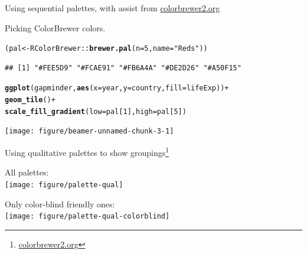 \documentclass[table]{beamer}\usepackage[]{graphicx}\usepackage[]{color}
\makeatletter
\newcommand{\hlnum}[1]{\textcolor[rgb]{0.686,0.059,0.569}{#1}}%
\newcommand{\hlstr}[1]{\textcolor[rgb]{0.192,0.494,0.8}{#1}}%
\newcommand{\hlopt}[1]{\textcolor[rgb]{0,0,0}{#1}}%
\newcommand{\hlstd}[1]{\textcolor[rgb]{0.345,0.345,0.345}{#1}}%
\newcommand{\hlkwb}[1]{\textcolor[rgb]{0.69,0.353,0.396}{#1}}%
\newcommand{\hlkwc}[1]{\textcolor[rgb]{0.333,0.667,0.333}{#1}}%
\newcommand{\hlkwd}[1]{\textcolor[rgb]{0.737,0.353,0.396}{\textbf{#1}}}%
\newenvironment{kframe}{%
 \def\at@end@of@kframe{}%
 \ifinner\ifhmode%
  \def\at@end@of@kframe{\end{minipage}}%
  \begin{minipage}{\columnwidth}%
 \fi\fi%
 \def\FrameCommand##1{\hskip\@totalleftmargin \hskip-\fboxsep
 \colorbox{shadecolor}{##1}\hskip-\fboxsep
     \hskip-\linewidth \hskip-\@totalleftmargin \hskip\columnwidth}%
 \MakeFramed {\advance\hsize-\width
   \@totalleftmargin\z@ \linewidth\hsize
   \@setminipage}}%
 {\par\unskip\endMakeFramed%
 \at@end@of@kframe}
\newenvironment{knitrout}{}{} %
\makeatother
\begin{document}

\begin{frame}[fragile]{Using sequential palettes, with assist from \href{https://colorbrewer2.org/}{colorbrewer2.org}}

Picking ColorBrewer colors.
\begin{knitrout}\tiny
{}\color{fgcolor}\begin{kframe}
\begin{alltt}
\hlstd{(pal} \hlkwb{<-} \hlstd{RColorBrewer}\hlopt{::}\hlkwd{brewer.pal}\hlstd{(}\hlkwc{n}\hlstd{=}\hlnum{5}\hlstd{,} \hlkwc{name}\hlstd{=}\hlstr{"Reds"}\hlstd{))}
\end{alltt}
\begin{verbatim}
## [1] "#FEE5D9" "#FCAE91" "#FB6A4A" "#DE2D26" "#A50F15"
\end{verbatim}
\begin{alltt}
\hlkwd{ggplot}\hlstd{(gapminder,} \hlkwd{aes}\hlstd{(}\hlkwc{x}\hlstd{=year,} \hlkwc{y}\hlstd{=country,} \hlkwc{fill}\hlstd{=lifeExp))} \hlopt{+}
    \hlkwd{geom_tile}\hlstd{()} \hlopt{+}
    \hlkwd{scale_fill_gradient}\hlstd{(}\hlkwc{low}\hlstd{=pal[}\hlnum{1}\hlstd{],} \hlkwc{high}\hlstd{=pal[}\hlnum{5}\hlstd{])}
\end{alltt}
\end{kframe}

{\centering \texttt{[image: figure/beamer-unnamed-chunk-3-1]} 

}



\end{knitrout}

\end{frame}



\begin{frame}[fragile]{Using qualitative palettes to show groupings\footnote{\href{https://colorbrewer2.org/}{colorbrewer2.org}}}

All palettes:\\
\texttt{[image: figure/palette-qual]}

Only color-blind friendly ones:\\
\texttt{[image: figure/palette-qual-colorblind]}



\end{frame}


\end{document}
